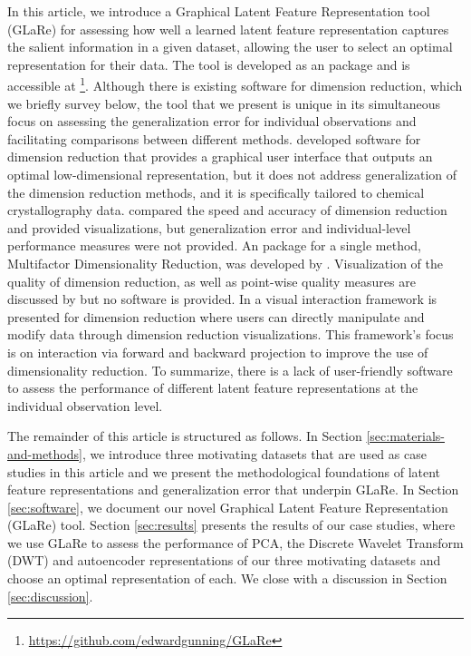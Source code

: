 In this article, we introduce a Graphical Latent Feature Representation tool (GLaRe) for assessing how well a learned latent feature representation captures the salient information in a given dataset, allowing the user to select an optimal representation for their data.
The tool is developed as an  \parencite{r_core_team_r_2022} package and is accessible at \footnote{\url{https://github.com/edwardgunning/GLaRe}}. 
Although there is existing software for dimension reduction, which we briefly survey below, the tool that we present is unique in its simultaneous focus on assessing the generalization error for individual observations and facilitating comparisons between different methods.
\textcite{samudrala_software_2014} developed software for dimension reduction that provides a graphical user interface that outputs an optimal low-dimensional representation, but it does not address generalization of the dimension reduction methods, and it is specifically tailored to chemical crystallography data.
\textcite{zubova_dimensionality_2018} compared the speed and accuracy of dimension reduction and provided visualizations, but generalization error and individual-level performance measures were not provided. 
An  package for a single method, Multifactor Dimensionality Reduction, was developed by \textcite{winham_r_2011}. Visualization of the quality of dimension reduction, as well as point-wise quality measures are discussed by \textcite{mokbel_visualizing_2013} but no software is provided. 
In \textcite{cavallo_visual_2018} a visual interaction framework is presented for dimension reduction where users can directly manipulate and modify data through dimension reduction visualizations. This framework's focus is on interaction via forward and backward projection to improve the use of dimensionality
reduction.
To summarize, there is a lack of user-friendly software to assess the performance of different latent feature representations at the individual observation level.

The remainder of this article is structured as follows.
In Section \ref{sec:materials-and-methods}, we introduce three motivating datasets that are used as case studies in this article and we present the methodological foundations of latent feature representations and generalization error that underpin GLaRe. 
In Section \ref{sec:software}, we document our novel Graphical Latent Feature Representation (GLaRe) tool.
Section \ref{sec:results} presents the results of our case studies, where we use GLaRe to assess the performance of PCA, the Discrete Wavelet Transform (DWT) and autoencoder representations of our three motivating datasets and choose an optimal representation of each.
We close with a discussion in Section \ref{sec:discussion}.


